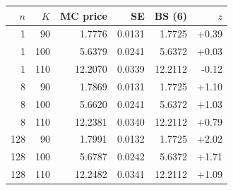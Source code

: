 \begin{tabular}{rrrrrr}
\toprule
$n$ & $K$ & MC price & SE & BS (6) & $z$ \\
\midrule
1 & 90 & 1.7776 & 0.0131 & 1.7725 & +0.39 \\
1 & 100 & 5.6379 & 0.0241 & 5.6372 & +0.03 \\
1 & 110 & 12.2070 & 0.0339 & 12.2112 & -0.12 \\
8 & 90 & 1.7869 & 0.0131 & 1.7725 & +1.10 \\
8 & 100 & 5.6620 & 0.0241 & 5.6372 & +1.03 \\
8 & 110 & 12.2381 & 0.0340 & 12.2112 & +0.79 \\
128 & 90 & 1.7991 & 0.0132 & 1.7725 & +2.02 \\
128 & 100 & 5.6787 & 0.0242 & 5.6372 & +1.71 \\
128 & 110 & 12.2482 & 0.0341 & 12.2112 & +1.09 \\
\bottomrule
\end{tabular}
